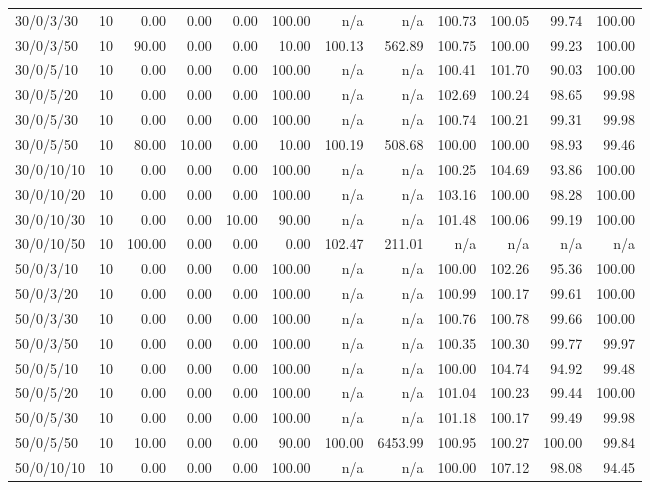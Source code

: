 \begin{table}[htbp]
{\begin{tabular}{lr*{10}{r}}
30/0/3/30 & 10 &  0.00 &  0.00 &  0.00 & 100.00 & n/a & n/a & 100.73 & 100.05 & 99.74 & 100.00 \\ 
30/0/3/50 & 10 & 90.00 &  0.00 &  0.00 & 10.00 & 100.13 & 562.89 & 100.75 & 100.00 & 99.23 & 100.00 \\ 
30/0/5/10 & 10 &  0.00 &  0.00 &  0.00 & 100.00 & n/a & n/a & 100.41 & 101.70 & 90.03 & 100.00 \\ 
30/0/5/20 & 10 &  0.00 &  0.00 &  0.00 & 100.00 & n/a & n/a & 102.69 & 100.24 & 98.65 & 99.98 \\ 
30/0/5/30 & 10 &  0.00 &  0.00 &  0.00 & 100.00 & n/a & n/a & 100.74 & 100.21 & 99.31 & 99.98 \\ 
30/0/5/50 & 10 & 80.00 & 10.00 &  0.00 & 10.00 & 100.19 & 508.68 & 100.00 & 100.00 & 98.93 & 99.46 \\ 
30/0/10/10 & 10 &  0.00 &  0.00 &  0.00 & 100.00 & n/a & n/a & 100.25 & 104.69 & 93.86 & 100.00 \\ 
30/0/10/20 & 10 &  0.00 &  0.00 &  0.00 & 100.00 & n/a & n/a & 103.16 & 100.00 & 98.28 & 100.00 \\ 
30/0/10/30 & 10 &  0.00 &  0.00 & 10.00 & 90.00 & n/a & n/a & 101.48 & 100.06 & 99.19 & 100.00 \\ 
30/0/10/50 & 10 & 100.00 &  0.00 &  0.00 &  0.00 & 102.47 & 211.01 & n/a & n/a & n/a & n/a \\ 
50/0/3/10 & 10 &  0.00 &  0.00 &  0.00 & 100.00 & n/a & n/a & 100.00 & 102.26 & 95.36 & 100.00 \\ 
50/0/3/20 & 10 &  0.00 &  0.00 &  0.00 & 100.00 & n/a & n/a & 100.99 & 100.17 & 99.61 & 100.00 \\ 
50/0/3/30 & 10 &  0.00 &  0.00 &  0.00 & 100.00 & n/a & n/a & 100.76 & 100.78 & 99.66 & 100.00 \\ 
50/0/3/50 & 10 &  0.00 &  0.00 &  0.00 & 100.00 & n/a & n/a & 100.35 & 100.30 & 99.77 & 99.97 \\ 
50/0/5/10 & 10 &  0.00 &  0.00 &  0.00 & 100.00 & n/a & n/a & 100.00 & 104.74 & 94.92 & 99.48 \\ 
50/0/5/20 & 10 &  0.00 &  0.00 &  0.00 & 100.00 & n/a & n/a & 101.04 & 100.23 & 99.44 & 100.00 \\ 
50/0/5/30 & 10 &  0.00 &  0.00 &  0.00 & 100.00 & n/a & n/a & 101.18 & 100.17 & 99.49 & 99.98 \\ 
50/0/5/50 & 10 & 10.00 &  0.00 &  0.00 & 90.00 & 100.00 & 6453.99 & 100.95 & 100.27 & 100.00 & 99.84 \\ 
50/0/10/10 & 10 &  0.00 &  0.00 &  0.00 & 100.00 & n/a & n/a & 100.00 & 107.12 & 98.08 & 94.45 \\ 

\end{tabular}}
\end{table}
